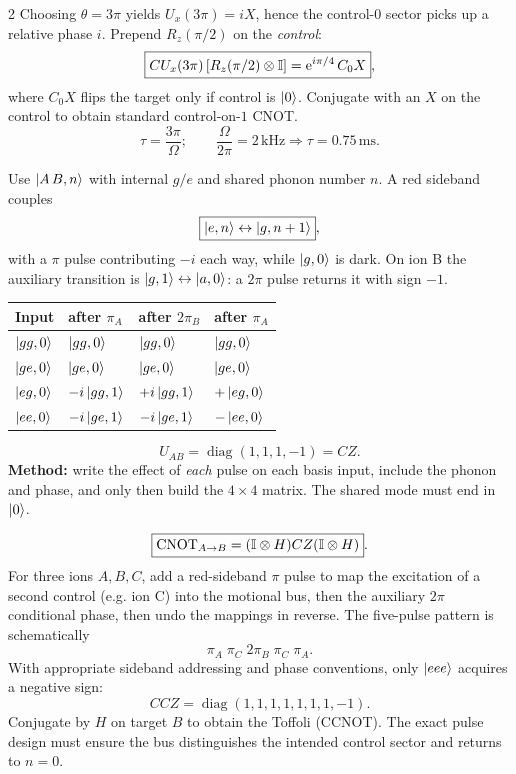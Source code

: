 \begin{multicols}{2}
Choosing $\theta=3\pi$ yields $U_x(3\pi)=iX$, hence the control-$0$ sector picks up a relative phase $i$. Prepend $R_z(\pi/2)$ on the \emph{control}:
\[\boxed{CU_x(3\pi)\,[R_z(\pi/2)\otimes\mathbb I]
=\mathrm e^{i\pi/4}\,C_0X},\]
where $C_0X$ flips the target only if control is $\left\lvert 0\right\rangle$. Conjugate with an $X$ on the control to obtain standard control-on-$1$ CNOT.
\[\boxed{\tau=\frac{3\pi}{\Omega};\qquad \frac\Omega{2\pi}=2\,\mathrm{kHz}\Rightarrow\tau=0.75\,\mathrm{ms}.}\]

\columnbreak
{}
Use $\left\lvert A\,B,n\right\rangle$ with internal $g/e$ and shared phonon number $n$. A red sideband couples
\[\boxed{\left\lvert e,n\right\rangle\leftrightarrow\left\lvert g,n+1\right\rangle},\]
with a $\pi$ pulse contributing $-i$ each way, while $\left\lvert g,0\right\rangle$ is dark. On ion B the auxiliary transition is $\left\lvert g,1\right\rangle\leftrightarrow\left\lvert a,0\right\rangle$: a $2\pi$ pulse returns it with sign $-1$.

\begin{center}\footnotesize
\renewcommand{\arraystretch}{1.15}
\begin{tabular}{@{}llll@{}}\toprule
Input&after $\pi_A$&after $2\pi_B$&after $\pi_A$\\\midrule
$\left\lvert gg,0\right\rangle$&$\left\lvert gg,0\right\rangle$&$\left\lvert gg,0\right\rangle$&$\left\lvert gg,0\right\rangle$\\
$\left\lvert ge,0\right\rangle$&$\left\lvert ge,0\right\rangle$&$\left\lvert ge,0\right\rangle$&$\left\lvert ge,0\right\rangle$\\
$\left\lvert eg,0\right\rangle$&$-i\left\lvert gg,1\right\rangle$&$+i\left\lvert gg,1\right\rangle$&$+\left\lvert eg,0\right\rangle$\\
$\left\lvert ee,0\right\rangle$&$-i\left\lvert ge,1\right\rangle$&$-i\left\lvert ge,1\right\rangle$&$-\left\lvert ee,0\right\rangle$\\\bottomrule
\end{tabular}
\end{center}
\[\boxed{U_{AB}=\operatorname{diag}(1,1,1,-1)=CZ}.\]
\textbf{Method:} write the effect of \emph{each} pulse on each basis input, include the phonon and phase, and only then build the $4\times4$ matrix. The shared mode must end in $\left\lvert 0\right\rangle$.

\[\boxed{\mathrm{CNOT}_{A\to B}=(\mathbb I\otimes H)CZ(\mathbb I\otimes H)}.\]
For three ions $A,B,C$, add a red-sideband $\pi$ pulse to map the excitation of a second control (e.g. ion C) into the motional bus, then the auxiliary $2\pi$ conditional phase, then undo the mappings in reverse. The five-pulse pattern is schematically
\[\pi_A\;\pi_C\;2\pi_B\;\pi_C\;\pi_A.\]
With appropriate sideband addressing and phase conventions, only $\left\lvert eee\right\rangle$ acquires a negative sign:
\[\boxed{CCZ=\operatorname{diag}(1,1,1,1,1,1,1,-1)}.\]
Conjugate by $H$ on target $B$ to obtain the Toffoli (CCNOT). The exact pulse design must ensure the bus distinguishes the intended control sector and returns to $n=0$.


\end{multicols}
